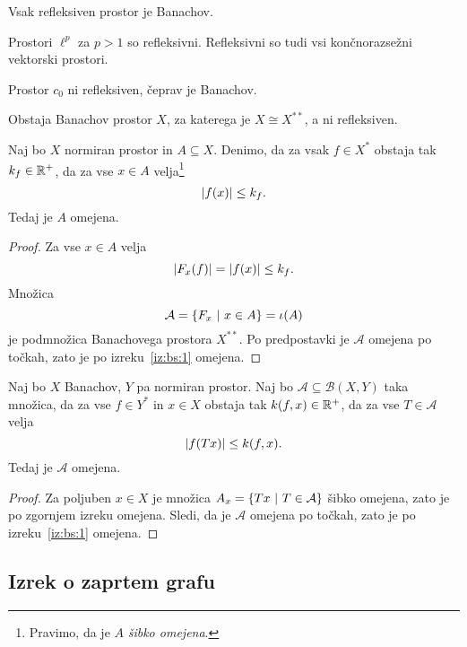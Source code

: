 \begin{opomba}
Vsak refleksiven prostor je Banachov.
\end{opomba}

\begin{zgled}
Prostori $\ell^p$ za $p>1$ so refleksivni. Refleksivni so tudi vsi
končnorazsežni vektorski prostori.
\end{zgled}

\begin{zgled}
Prostor $c_0$ ni refleksiven, čeprav je Banachov.
\end{zgled}

\begin{opomba}
Obstaja Banachov prostor $X$, za katerega je $X \cong X^{**}$, a ni
refleksiven.
\end{opomba}

\begin{izrek}
Naj bo $X$ normiran prostor in $A \subseteq X$. Denimo, da za vsak
$f \in X^*$ obstaja tak $k_f \in \mathbb{R}^+$, da za vse $x \in A$
velja\footnote{Pravimo, da je $A$ \emph{šibko omejena}.}
\[
\left\lvert f(x)\right\rvert \leq k_f.
\]
Tedaj je $A$ omejena.
\end{izrek}

\begin{proof}
Za vse $x \in A$ velja
\[
\left\lvert F_x(f)\right\rvert = \left\lvert f(x)\right\rvert \leq k_f.
\]
Množica
\[
\mathcal{A} = \left\{F_x~\middle\vert~x \in A\right\} = \iota(A)
\]
je podmnožica Banachovega prostora $X^{**}$. Po predpostavki je
$\mathcal{A}$ omejena po točkah, zato je po izreku~\ref{iz:bs:1}
omejena.
\end{proof}

\begin{posledica}
Naj bo $X$ Banachov, $Y$ pa normiran prostor. Naj bo
$\mathcal{A} \subseteq \mathcal{B}(X,Y)$ taka množica, da za vse
$f \in Y^*$ in $x \in X$ obstaja tak $k(f,x) \in \mathbb{R}^+$, da za vse
$T \in \mathcal{A}$ velja
\[
\left\lvert f(Tx)\right\rvert \leq k(f,x).
\]
Tedaj je $\mathcal{A}$ omejena.
\end{posledica}

\begin{proof}
Za poljuben $x \in X$ je množica $A_x=\left\{Tx~\middle\vert~T \in \mathcal{A}\right\}$
šibko omejena, zato je po zgornjem izreku omejena. Sledi, da je
$\mathcal{A}$ omejena po točkah, zato je po izreku~\ref{iz:bs:1}
omejena.
\end{proof}

\newpage

\subsection{Izrek o zaprtem grafu}

